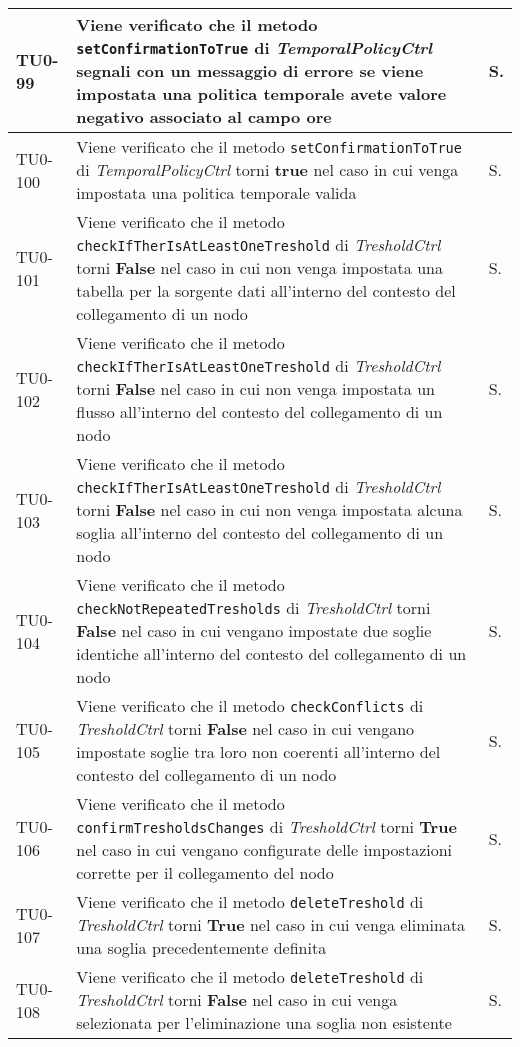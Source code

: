 \begin{longtable}{|C{.15\textwidth}|m{.66\textwidth}|C{.10\textwidth}|}
TU0-99 & Viene verificato che il metodo \texttt{setConfirmationToTrue} di \textit{TemporalPolicyCtrl} segnali con un messaggio di errore se viene impostata una politica temporale avete valore negativo associato al campo \textbf{ore} & S.\\
\hline
TU0-100 & Viene verificato che il metodo \texttt{setConfirmationToTrue} di \textit{TemporalPolicyCtrl} torni \textbf{true} nel caso in cui venga impostata una politica temporale valida & S.\\
\hline
{}TU0-101 & Viene verificato che il metodo \texttt{checkIfTherIsAtLeastOneTreshold} di \textit{TresholdCtrl} torni \textbf{False} nel caso in cui non venga impostata una tabella per la sorgente dati all'interno del contesto del collegamento di un nodo & S.\\
\hline
TU0-102 & Viene verificato che il metodo \texttt{checkIfTherIsAtLeastOneTreshold} di \textit{TresholdCtrl} torni \textbf{False} nel caso in cui non venga impostata un flusso all'interno del contesto del collegamento di un nodo & S.\\
\hline
{}TU0-103 & Viene verificato che il metodo \texttt{checkIfTherIsAtLeastOneTreshold} di \textit{TresholdCtrl} torni \textbf{False} nel caso in cui non venga impostata alcuna soglia all'interno del contesto del collegamento di un nodo & S.\\
\hline
TU0-104 & Viene verificato che il metodo \texttt{checkNotRepeatedTresholds} di \textit{TresholdCtrl} torni \textbf{False} nel caso in cui vengano impostate due soglie identiche all'interno del contesto del collegamento di un nodo & S.\\
\hline
{}TU0-105 & Viene verificato che il metodo \texttt{checkConflicts} di \textit{TresholdCtrl} torni \textbf{False} nel caso in cui vengano impostate soglie tra loro non coerenti all'interno del contesto del collegamento di un nodo & S.\\
\hline
TU0-106 & Viene verificato che il metodo \texttt{confirmTresholdsChanges} di \textit{TresholdCtrl} torni \textbf{True} nel caso in cui vengano configurate delle impostazioni corrette per il collegamento del nodo & S.\\
\hline
{}TU0-107 & Viene verificato che il metodo \texttt{deleteTreshold} di \textit{TresholdCtrl} torni \textbf{True} nel caso in cui venga eliminata una soglia precedentemente definita & S.\\
\hline
TU0-108 & Viene verificato che il metodo \texttt{deleteTreshold} di \textit{TresholdCtrl} torni \textbf{False} nel caso in cui venga selezionata per l'eliminazione una soglia non esistente & S.\\

\end{longtable}
